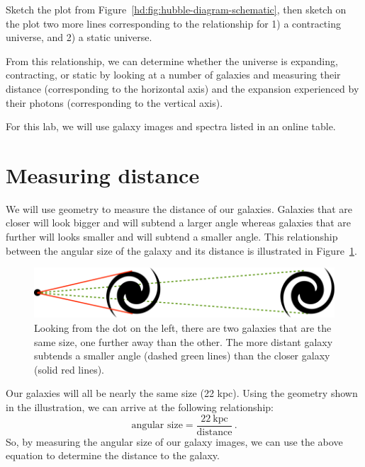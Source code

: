 \begin{steps}
	\item\label{hd:step:sketch} Sketch the plot from Figure~\ref{hd:fig:hubble-diagram-schematic}, then sketch on the plot two more lines corresponding to the
	relationship for 1) a contracting universe, and 2) a static universe.
\end{steps}

From this relationship, we can determine whether the universe is
expanding, contracting, or static by looking at a number of galaxies and
measuring their distance (corresponding to the horizontal axis) and the
expansion experienced by their photons (corresponding to the vertical axis).

For this lab, we will use galaxy images and spectra listed in an online
table.

\section{Measuring distance}

We will use geometry to measure the distance of our galaxies. Galaxies
that are closer will look bigger and will subtend a larger angle whereas
galaxies that are further will looks smaller and will subtend a smaller
angle. This relationship between the angular size of the galaxy and its
distance is illustrated in Figure~\ref{hd:fig:galaxy-subtend}.

\begin{figure}
	\centering
	\includegraphics[width=\textwidth]{hubble-diagram/galaxy-subtend}
	\caption{Looking from the dot on the left, there are two galaxies that are the same size, one further away than the other. The more distant galaxy subtends a smaller angle (dashed green lines) than the closer galaxy (solid red lines).}\label{hd:fig:galaxy-subtend}
\end{figure}

Our galaxies will all be nearly the same size (22 kpc). Using the
geometry shown in the illustration, we can arrive at the following
relationship:
\begin{equation}\label{hd:eq:size}
 \textrm{angular size} = \frac{22\:\textrm{kpc}}{\textrm{distance}} \,.
\end{equation}
So, by measuring the angular size of our galaxy images, we can use the
above equation to determine the distance to the galaxy.

